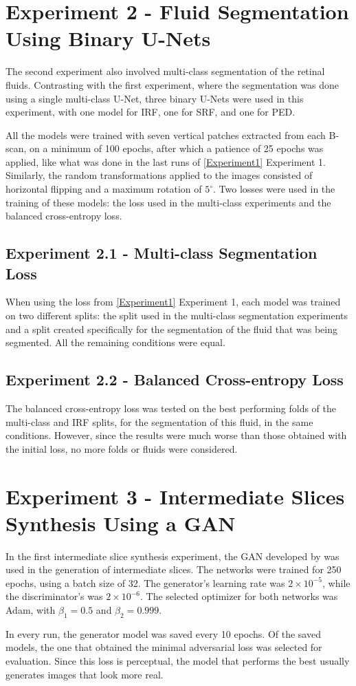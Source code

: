 \section{Experiment 2 - Fluid Segmentation Using Binary U-Nets}\label{Experiment2}

The second experiment also involved multi-class segmentation of the retinal fluids. Contrasting with the first experiment, where the segmentation was done using a single multi-class U-Net, three binary U-Nets were used in this experiment, with one model for IRF, one for SRF, and one for PED.
\par
All the models were trained with seven vertical patches extracted from each B-scan, on a minimum of 100 epochs, after which a patience of 25 epochs was applied, like what was done in the last runs of \ref{Experiment1} Experiment 1. Similarly, the random transformations applied to the images consisted of horizontal flipping and a maximum rotation of $5^{\circ}$. Two losses were used in the training of these models: the loss used in the multi-class experiments and the balanced cross-entropy loss.

\subsection{Experiment 2.1 - Multi-class Segmentation Loss}

When using the loss from \ref{Experiment1} Experiment 1, each model was trained on two different splits: the split used in the multi-class segmentation experiments and a split created specifically for the segmentation of the fluid that was being segmented. All the remaining conditions were equal.

\subsection{Experiment 2.2 - Balanced Cross-entropy Loss}

The balanced cross-entropy loss was tested on the best performing folds of the multi-class and IRF splits, for the segmentation of this fluid, in the same conditions. However, since the results were much worse than those obtained with the initial loss, no more folds or fluids were considered.

\section{Experiment 3 - Intermediate Slices Synthesis Using a GAN}
In the first intermediate slice synthesis experiment, the GAN developed by \textcite{Tran2020} was used in the generation of intermediate slices. The networks were trained for 250 epochs, using a batch size of 32. The generator's learning rate was $2 \times 10^{-5}$, while the discriminator's was $2 \times 10^{-6}$. The selected optimizer for both networks was Adam, with $\beta_{1}=0.5$ and $\beta_{2}=0.999$.
\par
In every run, the generator model was saved every 10 epochs. Of the saved models, the one that obtained the minimal adversarial loss was selected for evaluation. Since this loss is perceptual, the model that performs the best usually generates images that look more real.


